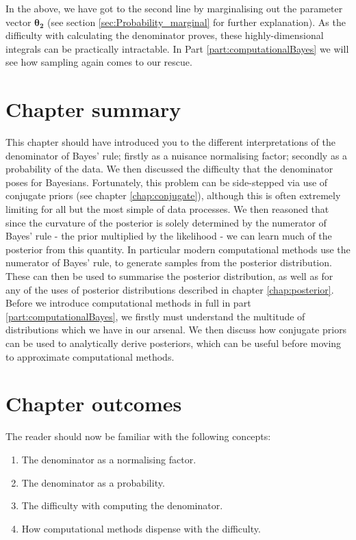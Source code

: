 \documentclass[11pt,fullpage]{book}
\begin{document}
In the above, we have got to the second line by marginalising out the parameter vector $\boldsymbol{\theta_2}$ (see section \ref{sec:Probability_marginal} for further explanation). As the difficulty with calculating the denominator proves, these highly-dimensional integrals can be practically intractable. In Part \ref{part:computationalBayes} we will see how sampling again comes to our rescue.

\section{Chapter summary}
This chapter should have introduced you to the different interpretations of the denominator of Bayes' rule; firstly as a nuisance normalising factor; secondly as a probability of the data. We then discussed the difficulty that the denominator poses for Bayesians. Fortunately, this problem can be side-stepped via use of conjugate priors (see chapter \ref{chap:conjugate}), although this is often extremely limiting for all but the most simple of data processes. We then reasoned that since the curvature of the posterior is solely determined by the numerator of Bayes' rule - the prior multiplied by the likelihood - we can learn much of the posterior from this quantity. In particular modern computational methods use the numerator of Bayes' rule, to generate samples from the posterior distribution. These can then be used to summarise the posterior distribution, as well as for any of the uses of posterior distributions described in chapter \ref{chap:posterior}. Before we introduce computational methods in full in part \ref{part:computationalBayes}, we firstly must understand the multitude of distributions which we have in our arsenal. We then discuss how conjugate priors can be used to analytically derive posteriors, which can be useful before moving to approximate computational methods.

\section{Chapter outcomes}
The reader should now be familiar with the following concepts:

\begin{enumerate}
\item The denominator as a normalising factor.
\item The denominator as a probability.
\item The difficulty with computing the denominator.
\item How computational methods dispense with the difficulty.
\end{enumerate}
\end{document}
